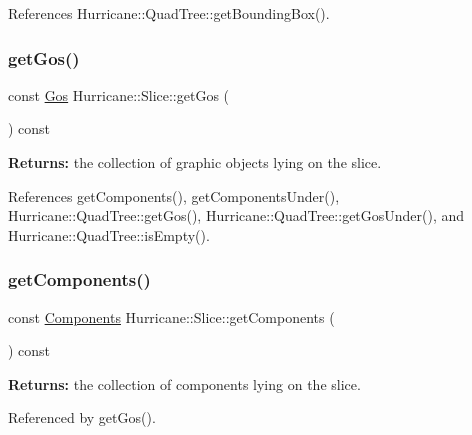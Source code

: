 References Hurricane\+::\+Quad\+Tree\+::get\+Bounding\+Box().

\mbox{\label{classHurricane_1_1Slice_abc257f5b91c01c01a618787fd73db97b}} 
\subsubsection{\texorpdfstring{get\+Gos()}{getGos()}}
{\footnotesize\ttfamily const \hyperlink{namespaceHurricane_a4456a34f3bc6766d471c3064ace19759}{Gos} Hurricane\+::\+Slice\+::get\+Gos (\begin{DoxyParamCaption}{ }\end{DoxyParamCaption}) const\hspace{0.3cm}{\ttfamily [inline]}}

{\bfseries Returns\+:} the collection of graphic objects lying on the slice. 

References get\+Components(), get\+Components\+Under(), Hurricane\+::\+Quad\+Tree\+::get\+Gos(), Hurricane\+::\+Quad\+Tree\+::get\+Gos\+Under(), and Hurricane\+::\+Quad\+Tree\+::is\+Empty().

\mbox{\label{classHurricane_1_1Slice_afe7c766d33e16461c3667af88e64773e}} 
\subsubsection{\texorpdfstring{get\+Components()}{getComponents()}}
{\footnotesize\ttfamily const \hyperlink{namespaceHurricane_a7d26d99aeb5dd6d70d51bd35d2473e72}{Components} Hurricane\+::\+Slice\+::get\+Components (\begin{DoxyParamCaption}{ }\end{DoxyParamCaption}) const}

{\bfseries Returns\+:} the collection of components lying on the slice. 

Referenced by get\+Gos().

\mbox{\label{classHurricane_1_1Slice_af672fc823044869db42a8f2df0672164}} 
